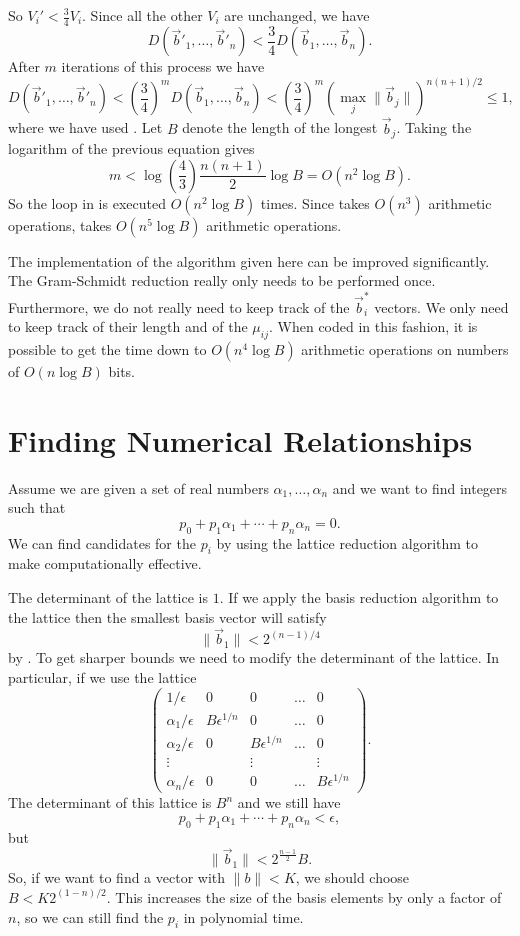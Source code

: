 So $V_i' < \frac{3}{4} V_i$.  Since all the other $V_i$ are unchanged,
we have
\[
D(\vec{b}'_1, \ldots, \vec{b}'_n) < \frac{3}{4}D(\vec{b}_1, \ldots, \vec{b}_n).
\]
After $m$ iterations of this process we have
\[
D(\vec{b}'_1, \ldots, \vec{b}'_n) 
    < \left(\frac{3}{4}\right)^m D(\vec{b}_1, \ldots, \vec{b}_n)
    < \left(\frac{3}{4}\right)^m (\max_j \|\vec{b}_j\|)^{n(n+1)/2} \le 1,
\]
where we have used .  Let $B$ denote the length
of the longest $\vec{b}_j$.  Taking the logarithm of the previous
equation gives
\[
m < \log\left(\frac{4}{3}\right) \frac{n(n+1)}{2} \log B = O(n^2 \log
B).
\]
So the loop in  is executed $O(n^2 \log B)$ times.
Since  takes $O(n^3)$ arithmetic operations,
 takes $O(n^5 \log B)$ arithmetic operations. 

The implementation of the algorithm given here can be improved
significantly.  The Gram-Schmidt reduction really only needs to be performed once.  Furthermore, we do
not really need to keep track of the $\vec{b}^{\ast}_i$ vectors.  We
only need to keep track of their length and of the $\mu_{ij}$.  When
coded in this fashion, it is possible to get the time down to $O(n^4
\log B)$ arithmetic operations on numbers of $O(n \log B)$ bits.

\section{Finding Numerical Relationships}
\label{RelationFinding:Sec}

Assume we are given a set of real numbers $\alpha_1, \ldots, \alpha_n$
and we want to find integers such that 
\[
p_0 + p_1 \alpha_1 + \cdots + p_n \alpha_n = 0.
\]
We can find candidates for the $p_i$ by using the lattice reduction
algorithm to make  computationally effective.

The determinant of the lattice  is $1$.
If we apply the basis reduction algorithm to the lattice then the
smallest basis vector will satisfy
\[
\|\vec{b}_1 \| < 2^{(n-1)/4}
\]
by .  To get sharper bounds we need to
modify the determinant of the lattice.  In particular, if we use the
lattice 
\[
\left(\begin{array}{cccccc}
1/\epsilon &  0 & 0 & \ldots & 0 \\
\alpha_1/\epsilon & B\epsilon^{1/n} & 0 & \ldots & 0 \\
\alpha_2/\epsilon & 0 & B\epsilon^{1/n} & \ldots & 0  \\
\vdots  & & \vdots & & \vdots \\
\alpha_n/\epsilon & 0 & 0 & \ldots & B\epsilon^{1/n}
\end{array}\right).
\]
The determinant of this lattice is $B^n$ and we still have 
\[
p_0 + p_1 \alpha_1 + \cdots + p_n \alpha_n < \epsilon,
\]
but 
\[
\|\vec{b}_1\| < 2^{\frac{n-1}{2}} B.
\]
So, if we want to find a vector with $\|b\| < K$, we should choose $B
< K 2^{(1-n)/2}$.  This increases the size of the basis elements by
only a factor of $n$, so we can still find the $p_i$ in polynomial
time.

